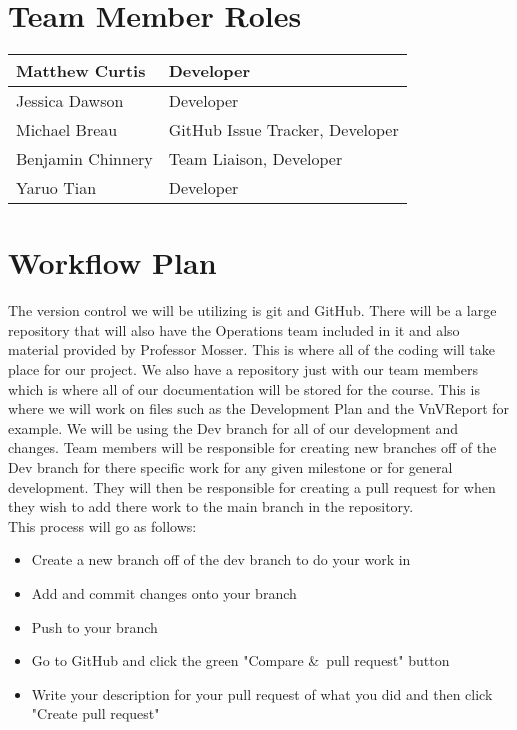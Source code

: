 \documentclass{article}
\begin{document}
\section{Team Member Roles}
\begin{center}
\begin{tabular}{ | m{3cm}| m{7cm} | } 
  \hline
  Matthew Curtis & Developer \\ 
  \hline
  Jessica Dawson & Developer \\ 
  \hline
  Michael Breau & GitHub Issue Tracker, Developer \\ 
 \hline
  Benjamin Chinnery & Team Liaison, Developer \\ 
 \hline
  Yaruo Tian & Developer \\ 
  \hline
\end{tabular}
\end{center}
\section{Workflow Plan}

The version control we will be utilizing is git and GitHub. There will be a large repository that will also have the Operations team included in it and also material provided by Professor Mosser. This is where all of the coding will take place for our project. We also have a repository just with our team members which is where all of our documentation will be stored for the course. This is where we will work on files such as the Development Plan and the VnVReport for example. We will be using the Dev branch for all of our development and changes. Team members will be responsible for creating new branches off of the Dev branch for there specific work for any given milestone or for general development. They will then be responsible for creating a pull request for when they wish to add there work to the main branch in the repository. \\

This process will go as follows:
\begin{itemize}
  \item Create a new branch off of the dev branch to do your work in
    \item Add and commit changes onto your branch
  \item Push to your branch
\item Go to GitHub and click the green "Compare \&\ pull request" button
  \item Write your description for your pull request of what you did and then click "Create pull request"
\end{itemize}
\end{document}
